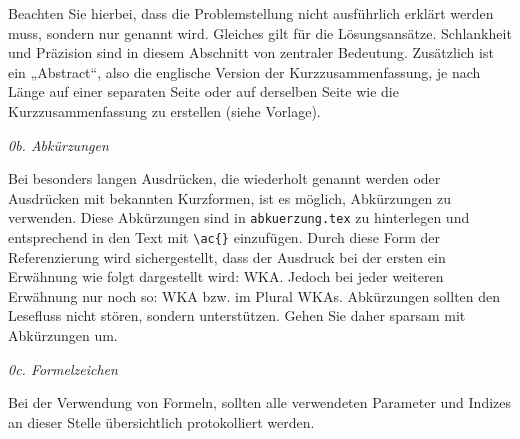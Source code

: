 Beachten Sie hierbei, dass die Problemstellung nicht ausführlich erklärt werden muss, sondern nur genannt wird. Gleiches gilt für die Lösungsansätze. Schlankheit und Präzision sind in diesem Abschnitt von zentraler Bedeutung. Zusätzlich ist ein „Abstract“, also die englische Version der Kurzzusammenfassung, je nach Länge auf einer separaten Seite oder auf derselben Seite wie die Kurzzusammenfassung zu erstellen (siehe Vorlage).\newline

\textit{0b. Abkürzungen}\par
Bei besonders langen Ausdrücken, die wiederholt genannt werden oder Ausdrücken mit bekannten Kurzformen, ist es möglich, Abkürzungen zu verwenden. Diese Abkürzungen sind in \verb|abkuerzung.tex| zu hinterlegen und entsprechend in den Text mit \verb|\ac{}| einzufügen. Durch diese Form der Referenzierung wird sichergestellt, dass der Ausdruck bei der ersten ein Erwähnung wie folgt dargestellt wird: \ac{WKA}. Jedoch bei jeder weiteren Erwähnung nur noch so: \ac{WKA} bzw. im Plural \acp{WKA}.  
Abkürzungen sollten den Lesefluss nicht stören, sondern unterstützen. Gehen Sie daher sparsam mit Abkürzungen um.
\newline



\textit{0c. Formelzeichen}\par
Bei der Verwendung von Formeln, sollten alle verwendeten Parameter und Indizes an dieser Stelle übersichtlich protokolliert werden.





